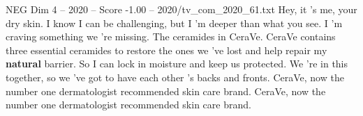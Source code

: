 \begin{textsample}{NEG Dim 4 – 2020 – Score -1.00 – 2020/tv\_com\_2020\_61.txt}  \label{ex:f4_neg_065}
Hey, it 's me, your dry skin.
I know I can be challenging, but I 'm deeper than what you see.
I 'm craving something we 're missing.
The ceramides in CeraVe.
CeraVe contains three essential ceramides to restore the ones we 've lost and help repair my \textbf{natural} barrier.
So I can lock in moisture and keep us protected.
We 're in this together, so we 've got to have each other 's backs and fronts.
CeraVe, now the number one dermatologist recommended skin care brand.
CeraVe, now the number one dermatologist recommended skin care brand.

\end{textsample}
